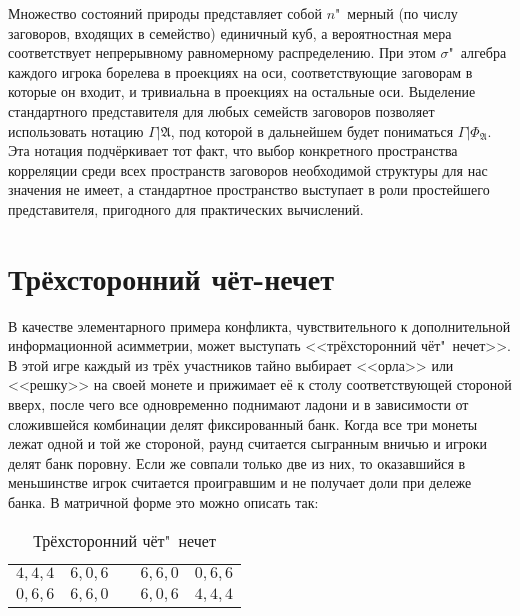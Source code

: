 Множество состояний природы представляет собой $n$"~мерный (по числу заговоров, входящих в семейство) единичный куб, а вероятностная мера соответствует непрерывному равномерному распределению. При этом $\sigma$"~алгебра каждого игрока борелева в проекциях на оси, соответствующие заговорам в которые он входит, и тривиальна в проекциях на остальные оси. Выделение стандартного представителя для любых семейств заговоров позволяет использовать нотацию $\Gamma | \mathfrak{A}$, под которой в дальнейшем будет пониматься $\Gamma | \Phi_{\mathfrak{A}}$. Эта нотация подчёркивает тот факт, что выбор конкретного пространства корреляции среди всех пространств заговоров необходимой структуры для нас значения не имеет, а стандартное пространство выступает в роли простейшего представителя, пригодного для практических вычислений.

\section{Трёхсторонний чёт-нечет}\label{sec:ch1/sec4}

В качестве элементарного примера конфликта, чувствительного к дополнительной информационной асимметрии, может выступать <<трёхсторонний чёт"~нечет>>. В этой игре каждый из трёх участников тайно выбирает <<орла>> или <<решку>> на своей монете и прижимает её к столу соответствующей стороной вверх, после чего все одновременно поднимают ладони и в зависимости от сложившейся комбинации делят фиксированный банк. Когда все три монеты лежат одной и той же стороной, раунд считается сыгранным вничью и игроки делят банк поровну. Если же совпали только две из них, то оказавшийся в меньшинстве игрок считается проигравшим и не получает доли при дележе банка. В матричной форме это можно описать так:
\begin{table} [htbp]
	\centering
	\begin{threeparttable}
		\caption{Трёхсторонний чёт"~нечет}
		\label{tab:coin3}
		\begin{tabular}{ |c|c|c|c|c| }
			\cline{1-2} \cline{4-5}
			\rule[-7pt]{0pt}{2em}$4, 4, 4$ &
			\rule[-7pt]{0pt}{2em}$6, 0, 6$ & \qquad\qquad\qquad &
			\rule[-7pt]{0pt}{2em}$6, 6, 0$ &
			\rule[-7pt]{0pt}{2em}$0, 6, 6$ \\
			\cline{1-2} \cline{4-5}
			\rule[-7pt]{0pt}{2em}$0, 6, 6$ &
			\rule[-7pt]{0pt}{2em}$6, 6, 0$ & \qquad\qquad\qquad &
			\rule[-7pt]{0pt}{2em}$6, 0, 6$ &
			\rule[-7pt]{0pt}{2em}$4, 4, 4$ \\
			\cline{1-2} \cline{4-5}
		\end{tabular}
	\end{threeparttable}
\end{table}

